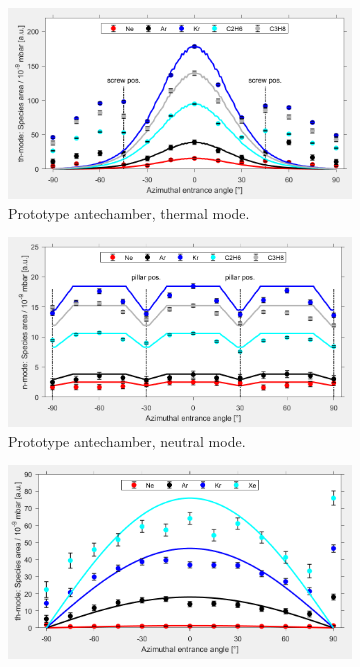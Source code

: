 	\begin{figure}[h!]
		\begin{subfigure}[t]{.5\textwidth}
			\centering
			\includegraphics[width=\textwidth]{Experiments/oldAnte_ThMode.png}
			\caption{Prototype antechamber, thermal mode.}
		\end{subfigure}
		\begin{subfigure}[t]{.5\textwidth}
			\centering
			\includegraphics[width=\textwidth]{Experiments/oldAnte_NMode.png}
			\caption{Prototype antechamber, neutral mode.}
		\end{subfigure}
		\begin{subfigure}[b]{.5\textwidth}
			\centering
			\includegraphics[width=\textwidth]{Experiments/newAnte_ThMode.png}

\end{subfigure}
\end{figure}
